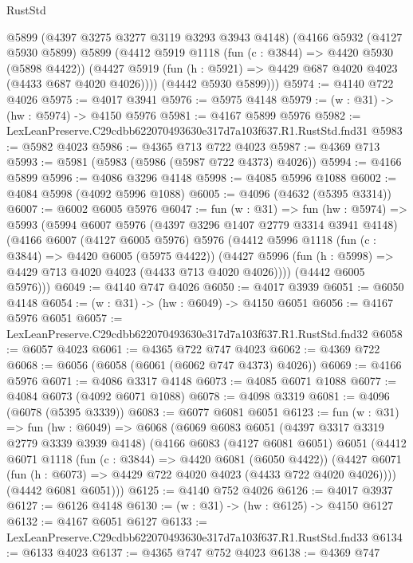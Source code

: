\begin{lexlean}{RustStd}
\begin{coremodule}
      @5899
      (@4397 @3275 @3277 @3119 @3293 @3943 @4148)
      (@4166
        @5932
        (@4127 @5930 @5899)
        @5899
        (@4412
          @5919
          @1118
          (fun (c : @3844) => @4420 @5930 (@5898 @4422))
          (@4427 @5919 (fun (h : @5921) => @4429 @687 @4020 @4023 (@4433 @687 @4020 @4026))))
        (@4442 @5930 @5899)))
@5974 := @4140 @722 @4026
@5975 := @4017 @3941
@5976 := @5975 @4148
@5979 := (w : @31) -> (hw : @5974) -> @4150 @5976
@5981 := @4167 @5899 @5976
@5982 := LexLeanPreserve.C29cdbb622070493630e317d7a103f637.R1.RustStd.fnd31
@5983 := @5982 @4023
@5986 := @4365 @713 @722 @4023
@5987 := @4369 @713
@5993 := @5981 (@5983 (@5986 (@5987 @722 @4373) @4026))
@5994 := @4166 @5899
@5996 := @4086 @3296 @4148
@5998 := @4085 @5996 @1088
@6002 := @4084 @5998 (@4092 @5996 @1088)
@6005 := @4096 (@4632 (@5395 @3314))
@6007 := @6002 @6005 @5976
@6047 := fun (w : @31) =>
  fun (hw : @5974) =>
  @5993
    (@5994
      @6007
      @5976
      (@4397 @3296 @1407 @2779 @3314 @3941 @4148)
      (@4166
        @6007
        (@4127 @6005 @5976)
        @5976
        (@4412
          @5996
          @1118
          (fun (c : @3844) => @4420 @6005 (@5975 @4422))
          (@4427 @5996 (fun (h : @5998) => @4429 @713 @4020 @4023 (@4433 @713 @4020 @4026))))
        (@4442 @6005 @5976)))
@6049 := @4140 @747 @4026
@6050 := @4017 @3939
@6051 := @6050 @4148
@6054 := (w : @31) -> (hw : @6049) -> @4150 @6051
@6056 := @4167 @5976 @6051
@6057 := LexLeanPreserve.C29cdbb622070493630e317d7a103f637.R1.RustStd.fnd32
@6058 := @6057 @4023
@6061 := @4365 @722 @747 @4023
@6062 := @4369 @722
@6068 := @6056 (@6058 (@6061 (@6062 @747 @4373) @4026))
@6069 := @4166 @5976
@6071 := @4086 @3317 @4148
@6073 := @4085 @6071 @1088
@6077 := @4084 @6073 (@4092 @6071 @1088)
@6078 := @4098 @3319
@6081 := @4096 (@6078 (@5395 @3339))
@6083 := @6077 @6081 @6051
@6123 := fun (w : @31) =>
  fun (hw : @6049) =>
  @6068
    (@6069
      @6083
      @6051
      (@4397 @3317 @3319 @2779 @3339 @3939 @4148)
      (@4166
        @6083
        (@4127 @6081 @6051)
        @6051
        (@4412
          @6071
          @1118
          (fun (c : @3844) => @4420 @6081 (@6050 @4422))
          (@4427 @6071 (fun (h : @6073) => @4429 @722 @4020 @4023 (@4433 @722 @4020 @4026))))
        (@4442 @6081 @6051)))
@6125 := @4140 @752 @4026
@6126 := @4017 @3937
@6127 := @6126 @4148
@6130 := (w : @31) -> (hw : @6125) -> @4150 @6127
@6132 := @4167 @6051 @6127
@6133 := LexLeanPreserve.C29cdbb622070493630e317d7a103f637.R1.RustStd.fnd33
@6134 := @6133 @4023
@6137 := @4365 @747 @752 @4023
@6138 := @4369 @747

\end{coremodule}
\end{lexlean}
